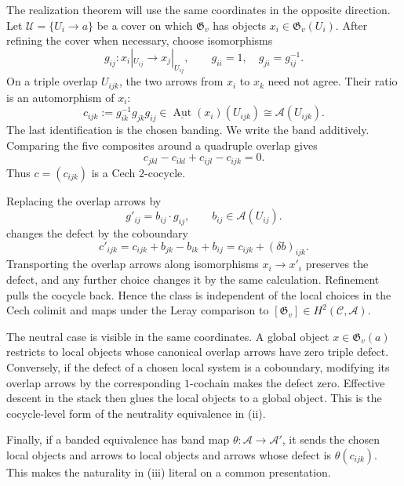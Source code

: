 The realization theorem will use the same coordinates in the opposite
direction.  Let
\(\mathcal U=\{U_i\to a\}\) be a cover on which
\(\mathfrak G_v\) has objects \(x_i\in\mathfrak G_v(U_i)\).  After refining
the cover when necessary, choose isomorphisms
\[
 g_{ij}:x_i|_{U_{ij}}\longrightarrow x_j|_{U_{ij}},
 \qquad
 g_{ii}=1,\quad g_{ji}=g_{ij}^{-1}.
\]
On a triple overlap \(U_{ijk}\), the two arrows from \(x_i\) to \(x_k\)
need not agree.  Their ratio is an automorphism of \(x_i\):
\begin{equation}\label{eq:giraud-triple-defect}
 c_{ijk}
 :=g_{ik}^{-1}g_{jk}g_{ij}
 \in\underline{\operatorname{Aut}}(x_i)(U_{ijk})
 \cong\mathscr A(U_{ijk}).
\end{equation}
The last identification is the chosen banding.  We write the band
additively.  Comparing the five composites around a quadruple overlap gives
\begin{equation}\label{eq:giraud-cocycle-equation}
 c_{jkl}-c_{ikl}+c_{ijl}-c_{ijk}=0.
\end{equation}
Thus \(c=(c_{ijk})\) is a Cech \(2\)-cocycle.

Replacing the overlap arrows by
\[
 g'_{ij}=b_{ij}\cdot g_{ij},
 \qquad b_{ij}\in\mathscr A(U_{ij}).
\]
changes the defect by the coboundary
\[
 c'_{ijk}
 =c_{ijk}+b_{jk}-b_{ik}+b_{ij}
 =c_{ijk}+(\delta b)_{ijk}.
\]
Transporting the overlap arrows along isomorphisms \(x_i\to x'_i\) preserves
the defect, and any further choice changes it by the same calculation.
Refinement pulls the cocycle back.  Hence the class is independent of the
local choices in the Cech colimit and maps under the Leray comparison to
\([\mathfrak G_v]\in H^2(\mathcal C,\mathscr A)\).

The neutral case is visible in the same coordinates.  A global object
\(x\in\mathfrak G_v(a)\) restricts to local objects whose canonical overlap
arrows have zero triple defect.  Conversely, if the defect of a chosen local
system is a coboundary, modifying its overlap arrows by the corresponding
\(1\)-cochain makes the defect zero.  Effective descent in the stack then
glues the local objects to a global object.  This is the cocycle-level
form of the neutrality equivalence in
(ii).

Finally, if a banded equivalence has band map
\(\theta:\mathscr A\to\mathscr A'\), it sends the chosen local objects and
arrows to local objects and arrows whose defect is \(\theta(c_{ijk})\).
This makes the naturality in
(iii) literal on a common
presentation.

